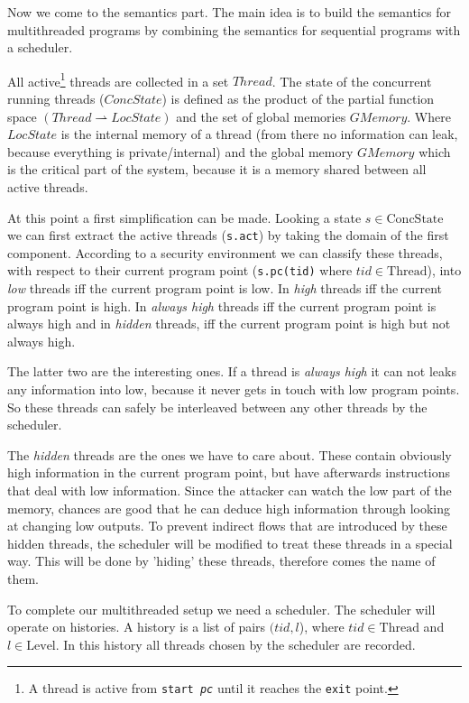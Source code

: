 \documentclass[a4paper,10pt]{llncs}
\begin{document}
Now we come to the semantics part. The main idea is to build the semantics
for multithreaded programs by combining the semantics for sequential programs
with a scheduler.

All active\footnote{A thread is active from \texttt{start \textit{pc}} until
it reaches the \texttt{exit} point.} threads are collected in a set $Thread$.
The state of the concurrent running threads ($ConcState$) is defined as the
product of the partial function space $(Thread \rightharpoonup LocState)$
and the set of global memories $GMemory$. Where $LocState$ is the internal
memory of a thread (from there no information can leak, because everything is private/internal) and the global memory $GMemory$ which is
the critical part of the system, because it is a memory shared between all
active threads.

At this point a first simplification can be made. Looking a state $s \in \text{ConcState}$ we can
first extract the active threads (\texttt{s.act}) by taking the domain of the first
component. According to a security environment we can classify these threads,
with respect to their current program point (\texttt{s.pc(tid)} where $tid \in \text{Thread}$),
into \textit{low} threads iff the current program point is low. In \textit{high}
threads iff the current program point is high. In \textit{always high} threads
iff the current program point is always high and in \textit{hidden} threads, iff
the current program point is high but not always high.

The latter two are the interesting ones. If a thread is \textit{always high} it
can not leaks any information into low, because it never gets in touch
with low program points. So these threads can safely be interleaved between any
other threads by the scheduler.

The \textit{hidden} threads are the ones we have to care about. These contain
obviously high information in the current program point, but have afterwards
instructions that deal with low information. Since the attacker can watch the
low part of the memory, chances are good that he can deduce high information
through looking at changing low outputs. To prevent indirect flows that are introduced by
these hidden threads, the scheduler will be modified to treat these threads
in a special way. This will be done by 'hiding' these threads, therefore comes
the name of them.

To complete our multithreaded setup we need a scheduler. The scheduler will
operate on histories. A history is a list of pairs $(tid, l$), where $tid \in
\text{Thread}$ and $l \in \text{Level}$. In this history all threads chosen by the scheduler
are recorded.
\end{document}
